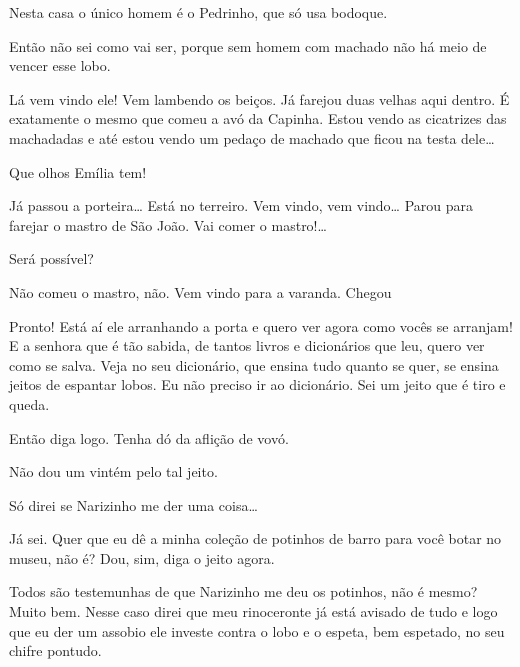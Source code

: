  Nesta casa o único homem é o Pedrinho, que só usa bodoque.

 Então não sei como vai ser, porque sem homem com machado não
há meio de vencer esse lobo.

  Lá vem vindo ele!
Vem lambendo os beiços. Já farejou duas velhas aqui dentro. É exatamente
o mesmo que comeu a avó da Capinha. Estou vendo as cicatrizes das
machadadas e até estou vendo um pedaço de machado que ficou na testa
dele\ldots{}

 Que olhos Emília tem!

  Já passou a porteira\ldots{} Está no
terreiro. Vem vindo, vem vindo\ldots{} Parou para farejar o mastro de
São João. Vai comer o mastro!\ldots{}

  Será possível?

  Não comeu o mastro, não. Vem vindo para
a varanda. Chegou 


 Pronto! Está aí ele arranhando a porta e quero ver agora como
vocês se arranjam!  E a senhora que é tão
sabida, de tantos livros e dicionários que leu, quero ver como se salva.
Veja no seu dicionário, que ensina tudo quanto se quer, se ensina jeitos
de espantar lobos. Eu não preciso ir ao dicionário. Sei um jeito que é
tiro e queda.

 Então diga logo. Tenha dó da aflição de vovó.

  Não dou um vintém pelo tal jeito.

  Só direi se Narizinho me der uma
coisa\ldots{}

 Já sei. Quer que eu dê a minha coleção de potinhos de
barro para você botar no museu, não é? Dou, sim, diga o jeito agora.

  Todos são testemunhas de que
Narizinho me deu os potinhos, não é mesmo? Muito bem. Nesse caso direi
que meu rinoceronte já está avisado de tudo e logo que eu der um assobio
ele investe contra o lobo e o espeta, bem espetado, no seu chifre
pontudo.

